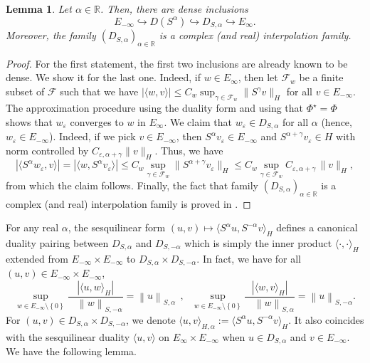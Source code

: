 \documentclass[11pt, letterpaper]{amsart}
\newtheorem{lem}[thm]{Lemma}
\theoremstyle{definition}
\theoremstyle{remark}
\numberwithin{equation}{section}
\begin{document}
\begin{lem}\label{density}
    Let $\alpha \in \mathbb{R}$. Then, there are dense inclusions 
    \begin{equation*}
   E_{-\infty} \hookrightarrow    D(S^\alpha) \hookrightarrow   D_{S,\alpha} \hookrightarrow E_\infty.
    \end{equation*}
Moreover, the family $\left ( D_{S,\alpha} \right )_{\alpha \in \mathbb{R}}$ is a complex (and real) interpolation family.
\end{lem}
\begin{proof}
For the first statement, the first two inclusions are already known to be dense. We show it for the last one. Indeed, if $w\in E_\infty$, then let $\mathcal{F}_w$ be a finite subset of $\mathcal{F}$ such that we have $|\langle w, v\rangle| \le C_w \sup_{\gamma \in \mathcal{F}_w} \|S^\gamma v\|_H$ for all $v\in E_{-\infty}$. The approximation procedure using the duality form and  using that $\Phi^\star=\Phi$ shows that $w_\varepsilon$ converges to $w$ in $E_\infty$.  We claim that $ w_\varepsilon \in D_{S,\alpha}$ for all $\alpha$ (hence, $w_\varepsilon\in E_{-\infty}$). Indeed,  if we pick $v\in E_{-\infty}$, then $S^{\alpha} v_\varepsilon \in E_{-\infty}$ and  $S^{\alpha+\gamma} v_\varepsilon \in H$ with norm controlled by $C_{\varepsilon,\alpha+\gamma} \|v\|_H$. Thus, we have 
$$    |\langle S^\alpha w_\varepsilon, v\rangle| = |\langle w, S^{\alpha} v_\varepsilon \rangle| \le C_w \sup_{\gamma \in \mathcal{F}_w} \|S^{\alpha+\gamma} v_\varepsilon\|_H \le C_w \sup_{\gamma \in \mathcal{F}_w} C_{\varepsilon,\alpha+\gamma}\, \|v\|_H,$$
from which  the claim follows. Finally, the fact that family $\left ( D_{S,\alpha} \right )_{\alpha \in \mathbb{R}}$ is a complex (and real) interpolation family is proved in \cite{auscher1997holomorphic}.
\end{proof}
For any real $\alpha$, the sesquilinear form $(u,v) \mapsto \langle S^\alpha u, S^{-\alpha} v \rangle_H$ defines a canonical duality pairing between $D_{S,\alpha}$ and $D_{S,-\alpha}$ which is simply the inner product $\langle \cdot, \cdot \rangle_H$ extended from $E_{-\infty}\times E_{-\infty}$ to $D_{S,\alpha} \times D_{S,-\alpha}$. In fact, we have for all $(u,v) \in E_{-\infty} \times E_{-\infty}$,
\begin{equation*}
    \sup_{w \in E_{-\infty}\setminus\left\{0 \right\}} \frac{\left|\langle u, w \rangle_H \right|}{\ \ \ \ \left\|w \right\|_{S,-\alpha}}=\left\|u \right\|_{S,\alpha} \ \  , \ \ \ \sup_{w \in E_{-\infty}\setminus\left\{0 \right\}} \frac{\left|\langle w, v \rangle_H \right|}{\ \ \ \ \left\|w \right\|_{S,\alpha}}=\left\|u \right\|_{S,-\alpha}.
\end{equation*}
For $(u,v) \in D_{S,\alpha} \times D_{S,-\alpha}$, we denote $\langle u, v \rangle_{H,\alpha}:= \langle S^\alpha u, S^{-\alpha} v \rangle_H$. 
It also coincides with the sesquilinear duality  $\langle u, v \rangle$  on $E_\infty \times E_{-\infty}$ when $u\in D_{S,\alpha}$ and $ v\in E_{-\infty}$. We have the following lemma.
\end{document}
